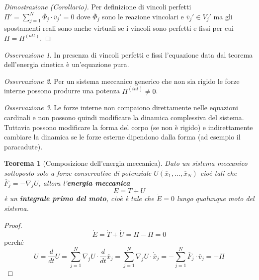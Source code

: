 \documentclass{book}
\theoremstyle{plain}
\newtheorem{teo}{Teorema}[chapter]
\theoremstyle{plain}
\theoremstyle{plain}
\theoremstyle{plain}
\theoremstyle{plain}
\theoremstyle{definition}
\theoremstyle{remark}
\newtheorem*{oss}{Osservazione}
\theoremstyle{definition}
\begin{document}
\begin{proof}[Dimostrazione (Corollario)]
    Per definizione di vincoli perfetti $\Pi'=\sum_{j=1}^N\overline{\Phi}_j\cdot\overline{v}_j'=0$ dove $\overline{\Phi}_j$ sono le reazione vincolari e $\overline{v}_j'\in V_j'$ ma gli spostamenti reali sono anche virtuali se i vincoli sono perfetti e fissi per cui $\Pi=\Pi^{(att)}$.
\end{proof}

\begin{oss}
    In presenza di vincoli perfetti e fissi l'equazione data dal teorema dell'energia cinetica è un'equazione pura.
\end{oss}

\begin{oss}
    Per un sistema meccanico generico che non sia rigido le forze interne possono produrre una potenza $\Pi^{(int)} \neq 0$.
\end{oss}

\begin{oss}
    Le forze interne non compaiono direttamente nelle equazioni cardinali e non possono quindi modificare la dinamica complessiva del sistema. Tuttavia possono modificare la forma del corpo (se non è rigido) e indirettamente cambiare la dinamica se le forze esterne dipendono dalla forma (ad esempio il paracadute).
\end{oss}

\begin{teo}[Composizione dell'energia meccanica]
    Dato un sistema meccanico sottoposto solo a forze conservative di potenziale $U(\overline{x}_1, \ldots, \overline{x}_N)$ cioè tali che $\overline{F}_j=-\nabla_j U$,  allora l'\textbf{energia meccanica}
    \begin{displaymath}
    \boxed{
        E=T+U
    }     
    \end{displaymath}
    è un \textbf{integrale primo del moto}, cioè è tale che $\dot{E}=0$ lungo qualunque moto del sistema.
\end{teo}

\begin{proof}
    \begin{displaymath}
        \Dot{E}=\Dot{T}+\Dot{U}=\Pi-\Pi=0
    \end{displaymath}
    perché
    \begin{displaymath}
        \Dot{U}=\frac{d}{dt}U=\sum_{j=1}^N\nabla_jU\cdot\frac{d}{dt}\overline{x}_j=\sum_{j=1}^N\nabla_jU\cdot\Dot{\overline{x}}_j=-\sum_{j=1}^N\overline{F}_j\cdot\overline{v}_j=-\Pi
    \end{displaymath}
\end{proof}
\end{document}
